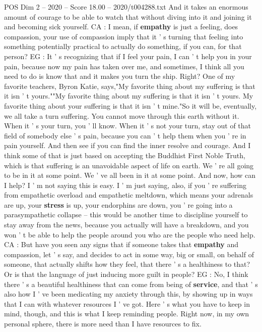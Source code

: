 \begin{textsample}{POS Dim 2 – 2020 – Score 18.00 – 2020/t004288.txt}
And it takes an enormous amount of courage to be able to watch that without diving into it and joining it and becoming sick yourself.
CA : I mean, if \textbf{empathy} is just a feeling, does compassion, your use of compassion imply that it ' s turning that feeling into something potentially practical to actually do something, if you can, for that person?
EG : It ' s recognizing that if I feel your pain, I can ' t help you in your pain, because now my pain has taken over me, and sometimes, I think all you need to do is know that and it makes you turn the ship.
Right?
One of my favorite teachers, Byron Katie, says,"My favorite thing about my suffering is that it isn ' t yours.""My favorite thing about my suffering is that it isn ' t yours.
My favorite thing about your suffering is that it isn ' t mine."So it will be, eventually, we all take a turn suffering.
You cannot move through this earth without it.
When it ' s your turn, you ' ll know.
When it ' s not your turn, stay out of that field of somebody else ' s pain, because you can ' t help them when you ' re in pain yourself.
And then see if you can find the inner resolve and courage.
And I think some of that is just based on accepting the Buddhist First Noble Truth, which is that suffering is an unavoidable aspect of life on earth.
We ' re all going to be in it at some point.
We ' ve all been in it at some point.
And now, how can I help?
I ' m not saying this is easy.
I ' m just saying, also, if you ' re suffering from empathetic overload and empathetic meltdown, which means your adrenals are up, your \textbf{stress} is up, your endorphins are down, you ' re going into a parasympathetic collapse -- this would be another time to discipline yourself to stay away from the news, because you actually will have a breakdown, and you won ' t be able to help the people around you who are the people who need help.
CA : But have you seen any signs that if someone takes that \textbf{empathy} and compassion, let ' s say, and decides to act in some way, big or small, on behalf of someone, that actually shifts how they feel, that there ' s a healthiness to that?
Or is that the language of just inducing more guilt in people?
EG : No, I think there ' s a beautiful healthiness that can come from being of \textbf{service}, and that ' s also how I ' ve been medicating my anxiety through this, by showing up in ways that I can with whatever resources I ' ve got.
Here ' s what you have to keep in mind, though, and this is what I keep reminding people.
Right now, in my own personal sphere, there is more need than I have resources to fix.

\end{textsample}
